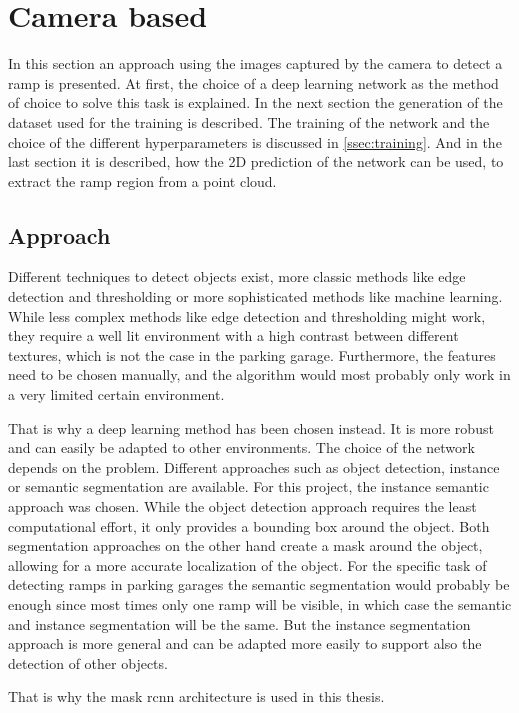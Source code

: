 \section{Camera based}
\label{sec:methods_camera}
In this section an approach using the images captured by the camera to detect a ramp is presented.
At first, the choice of a deep learning network as the method of choice to solve this task is explained.
In the next section the generation of the dataset used for the training is described.
The training of the network and the choice of the different hyperparameters is discussed in \cref{ssec:training}.
And in the last section it is described, how the 2D prediction of the network can be used, to extract the ramp region from a point cloud.

\subsection{Approach}
Different techniques to detect objects exist, more classic methods like edge detection and thresholding or more sophisticated methods like machine learning.
While less complex methods like edge detection and thresholding might work, they require a well lit environment with a high contrast between different textures, which is not the case in the parking garage.
Furthermore, the features need to be chosen manually, and the algorithm would most probably only work in a very limited certain environment.\par
That is why a deep learning method has been chosen instead.
It is more robust and can easily be adapted to other environments.
The choice of the network depends on the problem.
Different approaches such as object detection, instance or semantic segmentation are available.
For this project, the instance semantic approach was chosen.
While the object detection approach requires the least computational effort, it only provides a bounding box around the object.
Both segmentation approaches on the other hand create a mask around the object, allowing for a more accurate localization of the object.
For the specific task of detecting ramps in parking garages the semantic segmentation would probably be enough since most times only one ramp will be visible, in which case the semantic and instance segmentation will be the same.
But the instance segmentation approach is more general and can be adapted more easily to support also the detection of other objects.\par
That is why the mask \gls{rcnn} architecture is used in this thesis.
